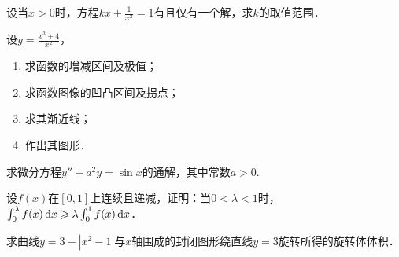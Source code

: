 \documentclass[plain,noanswer,medmath]{../../template/jnuexam}
\begin{document}
\begin{problem}
设当$x > 0$时，方程$kx + \frac{1}{x^2} = 1$有且仅有一个解，求$k$的取值范围．
\end{problem}



\begin{problem}
设$y = \frac{x^3 + 4}{x^2}$，
\begin{enumerate}
\item 求函数的增减区间及极值；
\item 求函数图像的凹凸区间及拐点；
\item 求其渐近线；
\item 作出其图形．
\end{enumerate}
\end{problem}



\begin{problem}
求微分方程$y'' + a^2 y = \sin x$的通解，其中常数$a > 0.$
\end{problem}



\begin{problem}
设$f(x)$在$[0,1]$上连续且递减，证明：当$0 < \lambda < 1$时，$\int_0^{\lambda}f(x)\mathop{}\!\mathrm{d} x \geqslant \lambda \int_0^1f(x)\mathop{}\!\mathrm{d} x$．
\end{problem}



\begin{problem}
求曲线$y = 3 - |x^2 - 1|$与$x$轴围成的封闭图形绕直线$y = 3$旋转所得的旋转体体积．
\end{problem}
\end{document}

